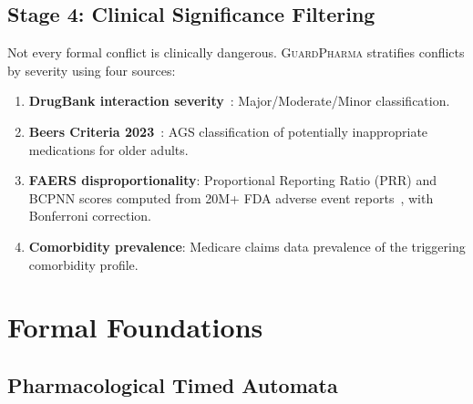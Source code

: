 \documentclass{article}
\theoremstyle{definition}
\begin{document}
\subsection{Stage 4: Clinical Significance Filtering}

Not every formal conflict is clinically dangerous. \textsc{GuardPharma} stratifies conflicts by severity using four sources:

\begin{enumerate}
\item \textbf{DrugBank interaction severity}~\cite{drugbank}: Major/Moderate/Minor classification.
\item \textbf{Beers Criteria 2023}~\cite{beers2023}: AGS classification of potentially inappropriate medications for older adults.
\item \textbf{FAERS disproportionality}: Proportional Reporting Ratio (PRR) and BCPNN scores computed from 20M+ FDA adverse event reports~\cite{faers_data}, with Bonferroni correction.
\item \textbf{Comorbidity prevalence}: Medicare claims data prevalence of the triggering comorbidity profile.
\end{enumerate}

\section{Formal Foundations}
\label{sec:formal}

\subsection{Pharmacological Timed Automata}
\end{document}

